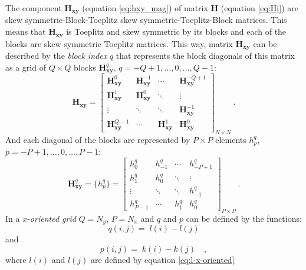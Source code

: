 The component $\mathbf{H_{xy}}$ (equation \ref{eq:hxy_mag}) of matrix $\mathbf{H}$ (equation \ref{eq:Hi}) are skew symmetric-Block-Toeplitz skew symmetric-Toeplitz-Block matrices. This means that $\mathbf{H_{xy}}$ is Toeplitz and skew symmetric by its blocks and each of the blocks are skew symmetric Toeplitz matrices. 
This way, matrix $\mathbf{H_{xy}}$ can be described by the \textit{block index} $q$ that represents the block diagonals of this matrix as a grid of $Q \times Q$ blocks $\mathbf{H}^{q}_\mathbf{xy}$, $q = -Q + 1, \dots, 0, \dots, Q - 1$:
\begin{equation}
\mathbf{H_{xy}} = \begin{bmatrix}
\mathbf{H}^{0}_\mathbf{xy}  & \mathbf{H}^{-1}_\mathbf{xy} & \cdots         & \mathbf{H}^{-Q+1}_\mathbf{xy} \\
\mathbf{H}^{1}_\mathbf{xy}  & \mathbf{H}^{0}_\mathbf{xy} & \ddots         & \vdots           \\ 
\vdots           & \ddots         & \ddots         & \mathbf{H}^{-1}_\mathbf{xy}   \\
\mathbf{H}^{Q-1}_\mathbf{xy} & \cdots         & \mathbf{H}^{1}_\mathbf{xy} & \mathbf{H}^{0}_\mathbf{xy}                
\end{bmatrix}_{N \times N} \: .
\label{eq:BTTB_Hxy}
\end{equation}
And each diagonal of the blocks are represented by $P \times P$ elements $h^{q}_{p}$, $p = -P + 1, \dots, 0, \dots, P - 1$:
\begin{equation}
\mathbf{H}^{q}_\mathbf{xy} =  \{h^{q}_p\} = \begin{bmatrix}
h^{q}_{0}   & h^{q}_{-1} & \cdots    & h^{q}_{-P+1} \\
h^{q}_{1}   & h^{q}_{0} & \ddots    & \vdots           \\ 
\vdots      & \ddots    & \ddots    & h^{q}_{-1}   \\
h^{q}_{P-1} & \cdots    & h^{q}_{1} & h^{q}_{0}                 
\end{bmatrix}_{P \times P} \: .
\label{eq:Hxy_block}
\end{equation}
In a $x$-\textit{oriented grid} $Q = N_{y}$, $P = N_{x}$ and $q$ and $p$ can be defined by the functions:
\begin{equation}
q(i, j) = \; l(i) - l(j) 
\label{eq:Hxy-q-x-oriented}
\end{equation}
and
\begin{equation}
p(i, j) = \; k(i) - k(j) \quad ,
\label{eq:Hxy-p-x-oriented}
\end{equation}
where $l(i)$ and $l(j)$ are defined by equation \ref{eq:l-x-oriented} 
